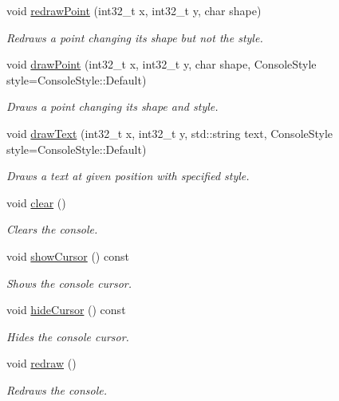 \begin{DoxyCompactItemize}
void \mbox{\hyperlink{class_graphics_a6597cd34b1aaddd828259e29db4043f1}{redraw\+Point}} (int32\+\_\+t x, int32\+\_\+t y, char shape)
\begin{DoxyCompactList}\small\item\em Redraws a point changing its shape but not the style. \end{DoxyCompactList}\item 
void \mbox{\hyperlink{class_graphics_a62c143f81f50dd3f15e256e46fa4bd62}{draw\+Point}} (int32\+\_\+t x, int32\+\_\+t y, char shape, Console\+Style style=Console\+Style\+::\+Default)
\begin{DoxyCompactList}\small\item\em Draws a point changing its shape and style. \end{DoxyCompactList}\item 
void \mbox{\hyperlink{class_graphics_ad94f3dff74f676c640223ae9bcd805ff}{draw\+Text}} (int32\+\_\+t x, int32\+\_\+t y, std\+::string text, Console\+Style style=Console\+Style\+::\+Default)
\begin{DoxyCompactList}\small\item\em Draws a text at given position with specified style. \end{DoxyCompactList}\item 
void \mbox{\hyperlink{class_graphics_a5006edbbdc540af376d4787f9d56fbdd}{clear}} ()
\begin{DoxyCompactList}\small\item\em Clears the console. \end{DoxyCompactList}\item 
void \mbox{\hyperlink{class_graphics_a11f04444e9fb3fc24ce14f6c1f2d19fc}{show\+Cursor}} () const
\begin{DoxyCompactList}\small\item\em Shows the console cursor. \end{DoxyCompactList}\item 
void \mbox{\hyperlink{class_graphics_a99b40f5926338922848e8c85b235e592}{hide\+Cursor}} () const
\begin{DoxyCompactList}\small\item\em Hides the console cursor. \end{DoxyCompactList}\item 
void \mbox{\hyperlink{class_graphics_abce7a73469960b556645afe23cb37ef9}{redraw}} ()
\begin{DoxyCompactList}\small\item\em Redraws the console. \end{DoxyCompactList}\item 

\end{DoxyCompactItemize}

